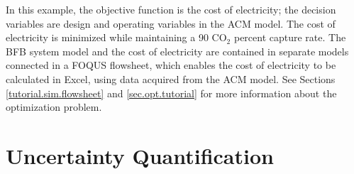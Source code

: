 In this example, the objective function is the cost of electricity; the decision variables are design and operating variables in the ACM model. The cost of electricity is minimized while maintaining a 90 CO$_2$ percent capture rate. The BFB system model and the cost of electricity are contained in separate models connected in a FOQUS flowsheet, which enables the cost of electricity to be calculated in Excel, using data acquired from the ACM model. See Sections \ref{tutorial.sim.flowsheet} and \ref{sec.opt.tutorial} for more information about the optimization problem.

\section{Uncertainty Quantification}
\label{sec:uq_intro}

